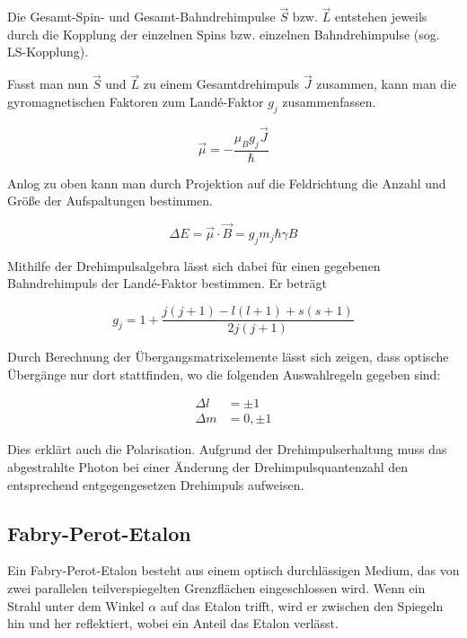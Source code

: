 \documentclass[a4paper,german,12pt,smallheadings]{scrartcl}
\begin{document}
Die Gesamt-Spin- und Gesamt-Bahndrehimpulse $\vec{S}$ bzw. $\vec{L}$ entstehen
jeweils durch die Kopplung der einzelnen Spins bzw. einzelnen Bahndrehimpulse
(sog. LS-Kopplung).

Fasst man nun $\vec{S}$ und $\vec{L}$ zu einem Gesamtdrehimpuls $\vec{J}$
zusammen, kann man die gyromagnetischen Faktoren zum Landé-Faktor $g_j$
zusammenfassen.

\begin{equation}
  \vec{\mu} = -\frac{\mu_B g_j \vec{J}}{\hbar}
\end{equation}

Anlog zu oben kann man durch Projektion auf die Feldrichtung die Anzahl und
Größe der Aufspaltungen bestimmen.

\begin{equation}
  \Delta E = \vec{\mu} \cdot \vec{B} = g_j m_j \hbar \gamma B
\end{equation}

Mithilfe der Drehimpulsalgebra lässt sich dabei für einen gegebenen
Bahndrehimpuls der Landé-Faktor bestimmen. Er beträgt

\begin{equation}
  g_j = 1 + \frac{j(j+1) - l(l+1) + s(s+1)}{2 j(j+1)}
\end{equation}

Durch Berechnung der Übergangsmatrixelemente lässt sich zeigen, dass optische
Übergänge nur dort stattfinden, wo die folgenden Auswahlregeln gegeben sind:

\begin{align}
  \Delta l &= \pm 1 \\
  \Delta m &= 0, \pm 1
\end{align}

Dies erklärt auch die Polarisation. Aufgrund der Drehimpulserhaltung muss das
abgestrahlte Photon bei einer Änderung der Drehimpulsquantenzahl den
entsprechend entgegengesetzen Drehimpuls aufweisen.

\subsection{Fabry-Perot-Etalon}

Ein Fabry-Perot-Etalon besteht aus einem optisch durchlässigen Medium, das von
zwei parallelen teilverspiegelten Grenzflächen eingeschlossen wird. Wenn ein
Strahl unter dem Winkel $\alpha$ auf das Etalon trifft, wird er zwischen den
Spiegeln hin und her reflektiert, wobei ein Anteil das Etalon verlässt.
\end{document}
